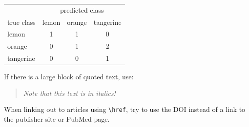 \documentclass[letterpaper, 12pt]{article}
\begin{document}
\begin{center}
\begin{tabular}{l|ccc}
& \multicolumn{3}{c}{predicted class} \\
true class & lemon & orange & tangerine \\
\hline
lemon & 1 & 1 & 0\\
orange & 0 & 1 & 2\\
tangerine & 0 & 0 & 1\\
\end{tabular}
\end{center}

If there is a large block of quoted text, use:

\begin{quote}
    \textit{Note that this text is in italics!}
\end{quote}

When linking out to articles using \verb|\href|, try to use the DOI instead of a link to the publisher site or PubMed page.
\end{document}
